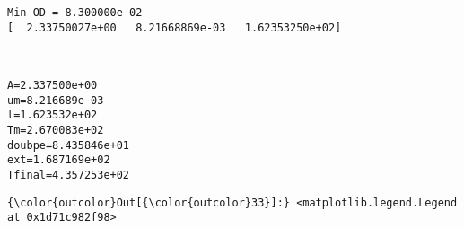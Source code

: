 \documentclass[11pt]{article}
\begin{document}
    \begin{Verbatim}[commandchars=\\\{\}]
Min OD = 8.300000e-02
[  2.33750027e+00   8.21668869e-03   1.62353250e+02]

    \end{Verbatim}

    \begin{center}
    \end{center}
    { \hspace*{\fill} \\}
    
    \begin{Verbatim}[commandchars=\\\{\}]
A=2.337500e+00
um=8.216689e-03
l=1.623532e+02
Tm=2.670083e+02
doubpe=8.435846e+01
ext=1.687169e+02
Tfinal=4.357253e+02

    \end{Verbatim}

            \begin{Verbatim}[commandchars=\\\{\}]
{\color{outcolor}Out[{\color{outcolor}33}]:} <matplotlib.legend.Legend at 0x1d71c982f98>
\end{Verbatim}
        
    \begin{center}
    \end{center}
    { \hspace*{\fill} \\}
    
    \begin{center}
    \end{center}
    { \hspace*{\fill} \\}
    
\end{document}
